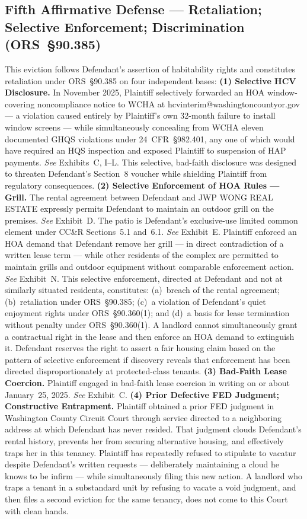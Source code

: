 \documentclass[10pt,letterpaper,oneside]{extarticle}
\begin{document}
\subsection{\textbf{Fifth Affirmative Defense ---
		Retaliation; Selective Enforcement; Discrimination
		(ORS~\S90.385)}}
This eviction follows Defendant's assertion of habitability
rights and constitutes retaliation under ORS~\S90.385 on
four independent bases:
\textbf{(1) Selective HCV Disclosure.}
In November 2025, Plaintiff selectively forwarded an HOA
window-covering noncompliance notice to WCHA at
hcvinterim@washingtoncountyor.gov --- a violation caused
entirely by Plaintiff's own 32-month failure to install
window screens --- while simultaneously concealing from
WCHA eleven documented GHQS violations under
24~CFR~\S982.401, any one of which would have required an
HQS inspection and exposed Plaintiff to suspension of HAP
payments. \textit{See} Exhibits~C, I--L. This selective,
bad-faith disclosure was designed to threaten Defendant's
Section~8 voucher while shielding Plaintiff from regulatory
consequences.
\textbf{(2) Selective Enforcement of HOA Rules --- Grill.}
The rental agreement between Defendant and JWP WONG REAL
ESTATE expressly permits Defendant to maintain an outdoor
grill on the premises. \textit{See} Exhibit~D. The patio
is Defendant's exclusive-use limited common element under
CC\&R Sections~5.1 and~6.1. \textit{See} Exhibit~E.
Plaintiff enforced an HOA demand that Defendant remove her
grill --- in direct contradiction of a written lease term
--- while other residents of the complex are permitted to
maintain grills and outdoor equipment without comparable
enforcement action. \textit{See} Exhibit~N. This selective
enforcement, directed at Defendant and not at similarly
situated residents, constitutes: (a)~breach of the rental
agreement; (b)~retaliation under ORS~\S90.385;
(c)~a violation of Defendant's quiet enjoyment rights under
ORS~\S90.360(1); and (d)~a basis for lease termination
without penalty under ORS~\S90.360(1). A landlord cannot
simultaneously grant a contractual right in the lease and
then enforce an HOA demand to extinguish it. Defendant
reserves the right to assert a fair housing claim based on
the pattern of selective enforcement if discovery reveals
that enforcement has been directed disproportionately at
protected-class tenants.
\textbf{(3) Bad-Faith Lease Coercion.}
Plaintiff engaged in bad-faith lease coercion in writing on
or about January~25, 2025. \textit{See} Exhibit~C.
\textbf{(4) Prior Defective FED Judgment;
	Constructive Entrapment.}
Plaintiff obtained a prior FED judgment in Washington County
Circuit Court through service directed to a neighboring
address at which Defendant has never resided. That judgment
clouds Defendant's rental history, prevents her from
securing alternative housing, and effectively traps her in
this tenancy. Plaintiff has repeatedly refused to stipulate
to vacatur despite Defendant's written requests ---
deliberately maintaining a cloud he knows to be infirm ---
while simultaneously filing this new action. A landlord who
traps a tenant in a substandard unit by refusing to vacate
a void judgment, and then files a second eviction for the
same tenancy, does not come to this Court with clean hands.
\end{document}
